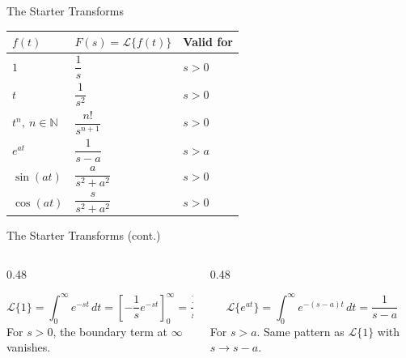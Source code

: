 \documentclass[aspectratio=169,11pt]{beamer}
\begin{document}
\begin{frame}{The Starter Transforms}
\footnotesize
\begin{topicsbox}
\centering
\begin{tabular}{@{}lll@{}}
\toprule
\textbf{$f(t)$} & \textbf{$F(s) = \mathcal{L}\{f(t)\}$} & \textbf{Valid for} \\
\midrule
$1$ & $\dfrac{1}{s}$ & $s > 0$ \\
$t$ & $\dfrac{1}{s^2}$ & $s > 0$ \\
$t^n,\ n\in\mathbb{N}$ & $\dfrac{n!}{s^{n+1}}$ & $s > 0$ \\
$e^{at}$ & $\dfrac{1}{s-a}$ & $s > a$ \\
$\sin(at)$ & $\dfrac{a}{s^2+a^2}$ & $s > 0$ \\
$\cos(at)$ & $\dfrac{s}{s^2+a^2}$ & $s > 0$ \\
\bottomrule
\end{tabular}
\end{topicsbox}
\end{frame}

\begin{frame}{The Starter Transforms (cont.)}
\footnotesize
\begin{columns}[T]
\begin{column}{0.48\textwidth}
\begin{examplebox}
\[\mathcal{L}\{1\} = \int_0^{\infty} e^{-st}\,dt = \left[-\frac{1}{s}e^{-st}\right]_0^{\infty} = \frac{1}{s}\]
For $s > 0$, the boundary term at $\infty$ vanishes.
\end{examplebox}
\end{column}
\begin{column}{0.48\textwidth}
\begin{examplebox}
\[\mathcal{L}\{e^{at}\} = \int_0^{\infty} e^{-(s-a)t}\,dt = \frac{1}{s-a}\]
For $s > a$. Same pattern as $\mathcal{L}\{1\}$ with $s \to s-a$.
\end{examplebox}
\end{column}
\end{columns}
\end{frame}
\end{document}
